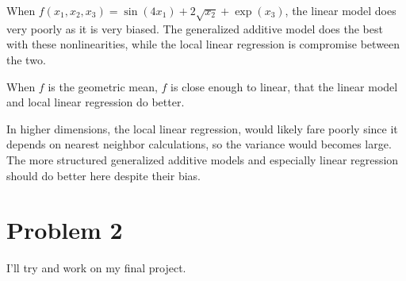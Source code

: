 \documentclass[letterpaper]{article}
\begin{document}
When $f(x_1, x_2, x_3) = \sin(4x_1) + 2\sqrt{x_2} + \exp(x_3)$, the linear
model does very poorly as it is very biased. The generalized additive model
does the best with these nonlinearities, while the local linear regression is
compromise between the two.

When $f$ is the geometric mean, $f$ is close enough to linear, that the linear
model and local linear regression do better.

In higher dimensions, the local linear regression, would likely fare poorly
since it depends on nearest neighbor calculations, so the variance would becomes
large. The more structured generalized additive models and especially
linear regression should do better here despite their bias.
\section*{Problem 2}

I'll try and work on my final project.
\end{document}
